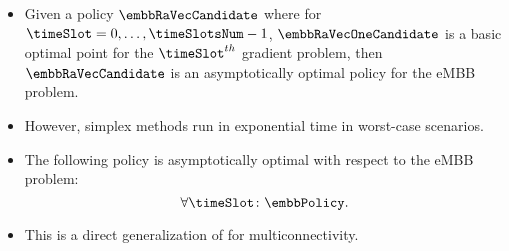 \begin{frame}
  \begin{itemize}
    \item Given a policy $\embbRaVecCandidate$ where for $\timeSlot = 0, \dots, \timeSlotsNum - 1$, $\embbRaVecOneCandidate$ is a basic optimal point for the $\timeSlot^{th}$ gradient problem, then $\embbRaVecCandidate$ is an asymptotically optimal policy for the eMBB problem\proofFootnote.
  \end{itemize}
\end{frame}

\begin{frame}
  \begin{itemize}
    \item However, simplex methods run in exponential time in worst-case scenarios.
  \end{itemize}
\end{frame}

\begin{frame}
  \begin{itemize}
    \item The following policy is asymptotically optimal with respect to the eMBB problem\proofFootnote:
      \begin{equation}
        \forall\timeSlot \colon \embbPolicy.
      \end{equation}
  \end{itemize}
\end{frame}

\begin{frame}
  \begin{itemize}
    \item This is a direct generalization of \cite{KW02} for multiconnectivity.
  \end{itemize}
\end{frame}

